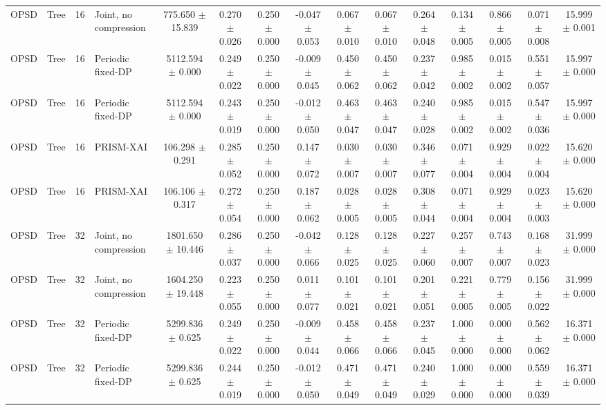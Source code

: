 \begin{table}[t]
\begin{tabular}{llllccccccccccc}
OPSD & Tree & 16 & Joint, no compression & 775.650 $\pm$ 15.839 & 0.270 $\pm$ 0.026 & 0.250 $\pm$ 0.000 & -0.047 $\pm$ 0.053 & 0.067 $\pm$ 0.010 & 0.067 $\pm$ 0.010 & 0.264 $\pm$ 0.048 & 0.134 $\pm$ 0.005 & 0.866 $\pm$ 0.005 & 0.071 $\pm$ 0.008 & 15.999 $\pm$ 0.001 \\
OPSD & Tree & 16 & Periodic fixed-DP & 5112.594 $\pm$ 0.000 & 0.249 $\pm$ 0.022 & 0.250 $\pm$ 0.000 & -0.009 $\pm$ 0.045 & 0.450 $\pm$ 0.062 & 0.450 $\pm$ 0.062 & 0.237 $\pm$ 0.042 & 0.985 $\pm$ 0.002 & 0.015 $\pm$ 0.002 & 0.551 $\pm$ 0.057 & 15.997 $\pm$ 0.000 \\
OPSD & Tree & 16 & Periodic fixed-DP & 5112.594 $\pm$ 0.000 & 0.243 $\pm$ 0.019 & 0.250 $\pm$ 0.000 & -0.012 $\pm$ 0.050 & 0.463 $\pm$ 0.047 & 0.463 $\pm$ 0.047 & 0.240 $\pm$ 0.028 & 0.985 $\pm$ 0.002 & 0.015 $\pm$ 0.002 & 0.547 $\pm$ 0.036 & 15.997 $\pm$ 0.000 \\
OPSD & Tree & 16 & PRISM-XAI & 106.298 $\pm$ 0.291 & 0.285 $\pm$ 0.052 & 0.250 $\pm$ 0.000 & 0.147 $\pm$ 0.072 & 0.030 $\pm$ 0.007 & 0.030 $\pm$ 0.007 & 0.346 $\pm$ 0.077 & 0.071 $\pm$ 0.004 & 0.929 $\pm$ 0.004 & 0.022 $\pm$ 0.004 & 15.620 $\pm$ 0.000 \\
OPSD & Tree & 16 & PRISM-XAI & 106.106 $\pm$ 0.317 & 0.272 $\pm$ 0.054 & 0.250 $\pm$ 0.000 & 0.187 $\pm$ 0.062 & 0.028 $\pm$ 0.005 & 0.028 $\pm$ 0.005 & 0.308 $\pm$ 0.044 & 0.071 $\pm$ 0.004 & 0.929 $\pm$ 0.004 & 0.023 $\pm$ 0.003 & 15.620 $\pm$ 0.000 \\
OPSD & Tree & 32 & Joint, no compression & 1801.650 $\pm$ 10.446 & 0.286 $\pm$ 0.037 & 0.250 $\pm$ 0.000 & -0.042 $\pm$ 0.066 & 0.128 $\pm$ 0.025 & 0.128 $\pm$ 0.025 & 0.227 $\pm$ 0.060 & 0.257 $\pm$ 0.007 & 0.743 $\pm$ 0.007 & 0.168 $\pm$ 0.023 & 31.999 $\pm$ 0.000 \\
OPSD & Tree & 32 & Joint, no compression & 1604.250 $\pm$ 19.448 & 0.223 $\pm$ 0.055 & 0.250 $\pm$ 0.000 & 0.011 $\pm$ 0.077 & 0.101 $\pm$ 0.021 & 0.101 $\pm$ 0.021 & 0.201 $\pm$ 0.051 & 0.221 $\pm$ 0.005 & 0.779 $\pm$ 0.005 & 0.156 $\pm$ 0.022 & 31.999 $\pm$ 0.000 \\
OPSD & Tree & 32 & Periodic fixed-DP & 5299.836 $\pm$ 0.625 & 0.249 $\pm$ 0.022 & 0.250 $\pm$ 0.000 & -0.009 $\pm$ 0.044 & 0.458 $\pm$ 0.066 & 0.458 $\pm$ 0.066 & 0.237 $\pm$ 0.045 & 1.000 $\pm$ 0.000 & 0.000 $\pm$ 0.000 & 0.562 $\pm$ 0.062 & 16.371 $\pm$ 0.000 \\
OPSD & Tree & 32 & Periodic fixed-DP & 5299.836 $\pm$ 0.625 & 0.244 $\pm$ 0.019 & 0.250 $\pm$ 0.000 & -0.012 $\pm$ 0.050 & 0.471 $\pm$ 0.049 & 0.471 $\pm$ 0.049 & 0.240 $\pm$ 0.029 & 1.000 $\pm$ 0.000 & 0.000 $\pm$ 0.000 & 0.559 $\pm$ 0.039 & 16.371 $\pm$ 0.000 \\

\end{tabular}
\end{table}
